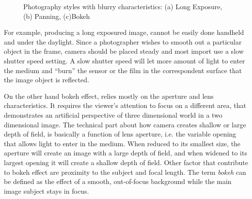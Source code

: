 \begin{figure}[ht!]
    \centering  
    \caption{Photography styles with blurry characteristics: (a) Long Exposure, (b) Panning, (c)Bokeh}
    \label{c2:blurriness}
\end{figure}

For example, producing a long exposured image, cannot be easily done handheld and under the daylight. Since a photographer wishes to smooth out a particular object in the frame, camera should be placed steady and most import use a slow shutter speed setting. A slow shutter speed will let more amount of light to enter the medium and ``burn'' the sensor or the film in the correspondent surface that the image object is reflected.

On the other hand bokeh effect, relies mostly on the aperture and lens characteristics. It requires the viewer's attention to focus on a different area, that demonstrates an artificial perspective of three dimensional world in a two dimensional image. The technical part about how camera creates shallow or large depth of field, is basically a function of lens aperture, i.e. the variable opening that allows light to enter in the medium. When reduced to its smallest size, the aperture will create an image with a large depth of field, and when widened to its largest opening it will create a shallow depth of field.
Other factor that contribute to bokeh effect are proximity to the subject and focal length.
The term \textit{bokeh} can be defined as the effect of a smooth, out-of-focus background while the main image subject stays in focus.


